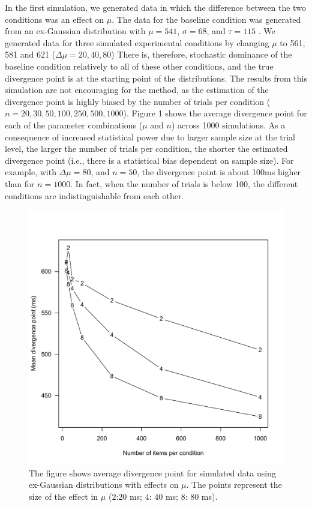 \documentclass{article}
\begin{document}
      In the first simulation, we generated data in which the difference between the two conditions was an effect on $\mu$.  The data for the baseline condition was generated from an ex-Gaussian distribution with $\mu= 541$, $\sigma = 68$, and $\tau = 115$ . We generated data for three simulated experimental conditions by changing $\mu$ to 561, 581 and 621  ($\Delta \mu = 20, 40, 80$) There is, therefore, stochastic dominance of the baseline condition relatively to all of these other conditions, and the true divergence point is at the starting point of the distributions.  The results from this simulation are not encouraging for the method, as the estimation of the divergence point is highly biased by the number of trials per condition ($n = 20, 30, 50, 100, 250, 500, 1000$).   Figure 1 shows the average divergence point for each of the parameter combinations ($\mu$ and $n$) across 1000 simulations. As a consequence of increased statistical power due to larger sample size at the trial level, the larger the number of trials per condition, the shorter the estimated divergence point (i.e., there is a statistical bias dependent on sample size). For example, with $\Delta \mu =  80$, and $n=50$, the divergence point is about 100ms higher than for $n = 1000$.  In fact, when the number of trials is below 100, the different conditions are indistinguishable from each other. 
      
          
\begin{figure}[h] %
	\includegraphics[width=5in]{Figure5.pdf}
	\caption{The figure shows average divergence point for simulated data using ex-Gaussian distributions with effects on $\mu$. The points represent the size of the effect in $\mu$ ($2$:20 ms; $4$: 40 ms; $8$: 80 ms).}
		\label{fig:mu-div}
\end{figure}
  
\end{document}
